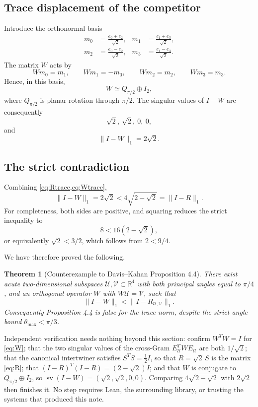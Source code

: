 \documentclass[11pt]{article}
\newtheorem{theorem}{Theorem}[section]
\theoremstyle{definition}
\newcommand{\R}{\mathbb R}
\newcommand{\trnorm}[1]{\lVert #1\rVert_1}
\newcommand{\svals}{\operatorname{sv}}
\newcommand{\DK}{Davis--Kahan}
\begin{document}
\subsection{Trace displacement of the competitor}

Introduce the orthonormal basis
\[
 \begin{aligned}
 m_0&=\frac{e_0+e_2}{\sqrt2},&
 m_1&=\frac{e_1+e_3}{\sqrt2},\\
 m_2&=\frac{e_0-e_2}{\sqrt2},&
 m_3&=\frac{e_1-e_3}{\sqrt2}.
 \end{aligned}
\]
The matrix $W$ acts by
\[
 Wm_0=m_1,\qquad Wm_1=-m_0,\qquad Wm_2=m_2,\qquad Wm_3=m_3.
\]
Hence, in this basis,
\[
 W\simeq Q_{\pi/2}\oplus I_2,
\]
where $Q_{\pi/2}$ is planar rotation through $\pi/2$.  The singular values of
$I-W$ are consequently
\[
 \sqrt2,\ \sqrt2,\ 0,\ 0,
\]
and
\begin{equation}
\label{eq:Wtrace}
 \trnorm{I-W}=2\sqrt2.
\end{equation}

\subsection{The strict contradiction}

Combining \cref{eq:Rtrace,eq:Wtrace},
\[
 \trnorm{I-W}=2\sqrt2
 <4\sqrt{2-\sqrt2}
 =\trnorm{I-R}.
\]
For completeness, both sides are positive, and squaring reduces the strict
inequality to
\[
 8<16(2-\sqrt2),
\]
or equivalently $\sqrt2<3/2$, which follows from $2<9/4$.

We have therefore proved the following.

\begin{theorem}[Counterexample to \DK{} Proposition 4.4]
\label{thm:counterexample}
There exist acute two-dimensional subspaces $\mathcal U,\mathcal V\subset\R^4$
with both principal angles equal to $\pi/4$, and an orthogonal operator $W$
with $W\mathcal U=\mathcal V$, such that
\[
 \trnorm{I-W}<\trnorm{I-R_{\mathcal U,\mathcal V}}.
\]
Consequently Proposition 4.4 is false for the trace norm, despite the strict
angle bound $\theta_{\max}<\pi/3$.
\end{theorem}

Independent verification needs nothing beyond this section: confirm
$W^TW=I$ for \cref{eq:W}; that the two singular values of the cross-Gram
$E_{\mathcal U}^TWE_{\mathcal U}$ are both $1/\sqrt2$; that the canonical
intertwiner satisfies $S^TS=\frac12I$, so that $R=\sqrt2\,S$ is the matrix
\cref{eq:R}; that $(I-R)^T(I-R)=(2-\sqrt2)I$; and that $W$ is conjugate to
$Q_{\pi/2}\oplus I_2$, so $\svals(I-W)=(\sqrt2,\sqrt2,0,0)$.  Comparing
$4\sqrt{2-\sqrt2}$ with $2\sqrt2$ then finishes it.  No step requires Lean, the
surrounding library, or trusting the systems that produced this note.
\end{document}
